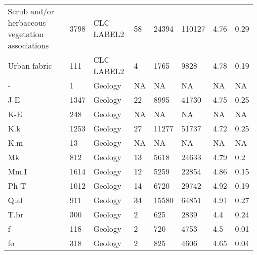 \begin{sidewaystable*}
\begin{tabular*}{\textwidth}{@{\extracolsep{\fill}}llllllll@{\extracolsep{\fill}}}
Scrub and/or herbaceous vegetation associations & 3798 & CLC LABEL2           & 58      & 24394          & 110127        & 4.76          & 0.29        \\
Urban fabric                                    & 111  & CLC LABEL2           & 4       & 1765           & 9828          & 4.78          & 0.19        \\
-                                               & 1    & Geology              & NA      & NA             & NA            & NA            & NA          \\
J-E                                             & 1347 & Geology              & 22      & 8995           & 41730         & 4.75          & 0.25        \\
K-E                                             & 248  & Geology              & NA      & NA             & NA            & NA            & NA          \\
K.k                                             & 1253 & Geology              & 27      & 11277          & 51737         & 4.72          & 0.25        \\
K.m                                             & 13   & Geology              & NA      & NA             & NA            & NA            & NA          \\
Mk                                              & 812  & Geology              & 13      & 5618           & 24633         & 4.79          & 0.2         \\
Mm.I                                            & 1614 & Geology              & 12      & 5259           & 22854         & 4.86          & 0.15        \\
Ph-T                                            & 1012 & Geology              & 14      & 6720           & 29742         & 4.92          & 0.19        \\
Q.al                                            & 911  & Geology              & 34      & 15580          & 64851         & 4.91          & 0.27        \\
T.br                                            & 300  & Geology              & 2       & 625            & 2839          & 4.4           & 0.24        \\
f                                               & 118  & Geology              & 2       & 720            & 4753          & 4.5           & 0.01        \\
fo                                              & 318  & Geology              & 2       & 825            & 4606          & 4.65          & 0.04        \\

\end{tabular*}
\end{sidewaystable*}

